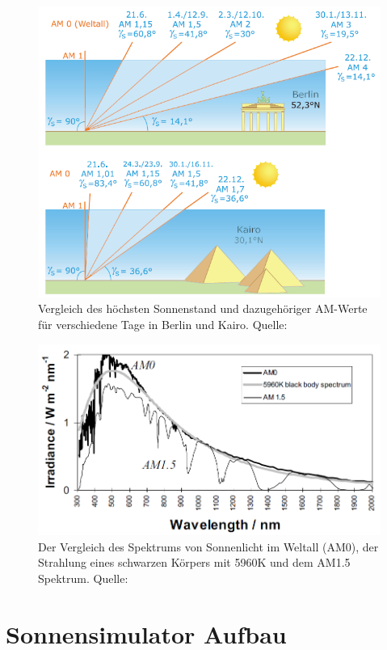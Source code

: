 \documentclass[a4paper,bibtotoc,oneside]{scrbook}
\begin{document}
\begin{figure}[htbp]
\centering
\includegraphics[width=125mm]{img/berlin.png}
\caption[Sonnenspektrum]{Vergleich des höchsten Sonnenstand und dazugehöriger AM-Werte für verschiedene Tage in Berlin und Kairo. Quelle: \cite{q01}}\label{airmass}
\end{figure}

\begin{figure}[htbp]
\centering
\includegraphics[width=125mm]{img/am.png}
\caption[Sonnenspektrum]{Der Vergleich des Spektrums von Sonnenlicht im Weltall (AM0), der Strahlung eines schwarzen Körpers mit 5960K und dem AM1.5 Spektrum. Quelle: \cite{n01}}\label{sunspec}
\end{figure}


\section{Sonnensimulator Aufbau}\thispagestyle{empty}
\end{document}
